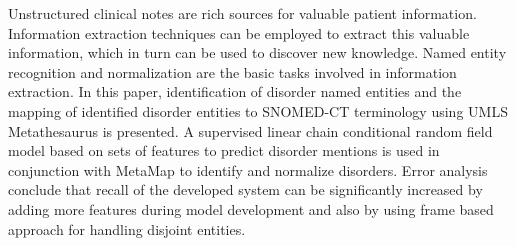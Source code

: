 Unstructured clinical notes are rich sources for valuable patient information. Information extraction techniques can be employed to extract this valuable information, which in turn can be used to discover new knowledge. Named entity recognition and normalization are the basic tasks involved in information extraction. In this paper, identification of disorder named entities and the mapping of identified disorder entities to SNOMED-CT terminology using UMLS Metathesaurus is presented. A supervised linear chain conditional random field model based on sets of features to predict disorder mentions is used in conjunction with MetaMap to identify and normalize disorders. Error analysis conclude that recall of the developed system can be significantly increased by adding more features during model development and also by using frame based approach for handling disjoint entities.
